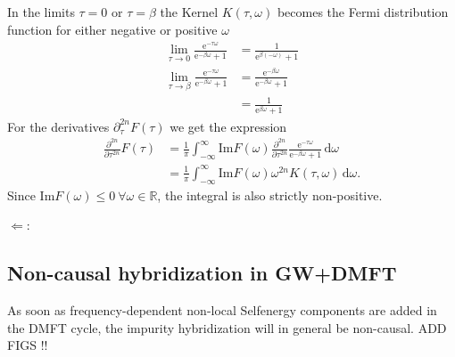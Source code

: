 \documentclass[12pt,a4paper]{scrartcl}
\numberwithin{equation}{section}
\begin{document}
In the limits $\tau=0$ or $\tau = \beta$ the Kernel $K(\tau,\omega)$ becomes the Fermi
distribution function for either negative or positive $\omega$
\begin{align}
 \lim\limits_{\tau\rightarrow 0}
 \frac{\mathrm{e}^{-\tau\omega}}{\mathrm{e}^{-\beta\omega}+1} 
 &=  \frac{1}{\mathrm{e}^{\beta(-\omega)}+1} \\
  \lim\limits_{\tau\rightarrow \beta}
 \frac{\mathrm{e}^{-\tau\omega}}{\mathrm{e}^{-\beta\omega}+1} 
 &= \frac{\mathrm{e}^{-\beta\omega}}{\mathrm{e}^{-\beta\omega}+1} \\
 &= \frac{1}{\mathrm{e}^{\beta\omega}+1}
\end{align}
For the derivatives $\partial_{\tau}^{2n} F(\tau) $ 
we get the expression
\begin{align}
\frac{\partial^{2n} }{\partial \tau^{2n}} F(\tau)
&=\frac{1}{\pi} \int_{-\infty}^{\infty} \mathrm{Im}F(\omega) 
 \frac{\partial^{2n} }{\partial \tau^{2n}}
          \frac{\mathrm{e}^{-\tau\omega}}{\mathrm{e}^{-\beta\omega}+1} \, \mathrm{d}\omega   \\
%             
&= \frac{1}{\pi} \int_{-\infty}^{\infty} \mathrm{Im}F(\omega) 
\omega^{2n}   K(\tau,\omega) \, \mathrm{d}\omega.
\end{align}
Since $\mathrm{Im}F(\omega) \leq 0 \  \forall \omega \in \mathbb{R}$,
the integral is also strictly non-positive.

\bigskip

$\Leftarrow$:




\subsection{Non-causal hybridization in GW+DMFT}
As soon as frequency-dependent non-local Selfenergy components are
added in the DMFT cycle, the impurity hybridization will in general
be non-causal. ADD FIGS !!




\clearpage
\end{document}
